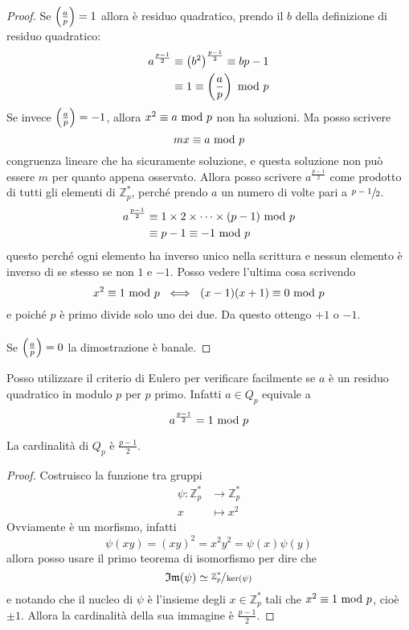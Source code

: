 \begin{proof}
	Se $\left(\frac{a}{p}\right)=1$ allora è residuo quadratico, prendo il $b$ della definizione di residuo quadratico:
	\begin{align*}
	a^{\frac{p-1}{2}}&\equiv \left(b^2\right)^{\frac{p-1}{2}}\equiv b{p-1}\\ 
	&\equiv 1\equiv\left(\frac{a}{p}\right)\ \mathrm{mod}\ p
	\end{align*}
	Se invece $\left(\frac{a}{p}\right)=-1$, allora $x^2\equiv a\ \mathrm{mod}\ p$ non ha soluzioni. Ma posso scrivere 
	\begin{equation*}
	mx\equiv a\ \mathrm{mod}\ p
	\end{equation*}
	congruenza lineare che ha sicuramente soluzione, e questa soluzione non può essere $m$ per quanto appena osservato. Allora posso scrivere $a^{\frac{p-1}{2}}$ come prodotto di tutti gli elementi di $\mathbb{Z}_p^*$, perché prendo $a$ un numero di volte pari a $\sfrac{p-1}{2}$.
	\begin{align*}
	a^{\frac{p-1}{2}}&\equiv1\times2\times\dots\times(p-1)\ \mathrm{mod}\ p\\
	&\equiv p-1\equiv-1 \ \mathrm{mod}\ p
	\end{align*}
	questo perché ogni elemento ha inverso unico nella scrittura e nessun elemento è inverso di se stesso se non $1$ e $-1$. Posso vedere l'ultima cosa scrivendo 
	\begin{equation*}
	x^2\equiv1\ \mathrm{mod}\ p \ \iff \ (x-1)(x+1)\equiv0\ \mathrm{mod}\ p
	\end{equation*}
	e poiché $p$ è primo divide solo uno dei due. Da questo ottengo $+1$ o $-1$. \\ \\
	Se $\left(\frac{a}{p}\right)=0$ la dimostrazione è banale.
\end{proof}
\begin{osservazione}
	Posso utilizzare il criterio di Eulero per verificare facilmente se $a$ è un residuo quadratico in modulo $p$ per $p$ primo. Infatti $a\in Q_p$ equivale a
	\begin{equation*}
	a^{\frac{p-1}{2}}=1\ \mathrm{mod}\ p
	\end{equation*}
\end{osservazione}
\begin{proposizione}
	La cardinalità di $Q_p$ è $\frac{p-1}{2}$.
\end{proposizione}
\begin{proof}
	Costruisco la funzione tra gruppi
	\begin{align*}
	\psi:\mathbb{Z}_p^*&\longrightarrow\mathbb{Z}_p^*\\
	x&\longmapsto x^2
	\end{align*}
	Ovviamente è un morfismo, infatti 
		\begin{equation*}
		\psi(xy)=(xy)^2=x^2y^2=\psi(x)\psi(y)
		\end{equation*}
		allora posso usare il primo teorema di isomorfismo per dire che 
		\begin{equation*}
		\operatorname{\mathfrak{Im}}(\psi)\simeq\sfrac{\mathbb{Z}_p^*}{\ker(\psi)}
		\end{equation*}
		e notando che il nucleo di $\psi$ è l'insieme degli $x\in\mathbb{Z}_p^*$ tali che $x^2\equiv1\ \mathrm{mod}\ p$, cioè $\pm1$. Allora la cardinalità della sua immagine è $\frac{p-1}{2}$.
\end{proof}
